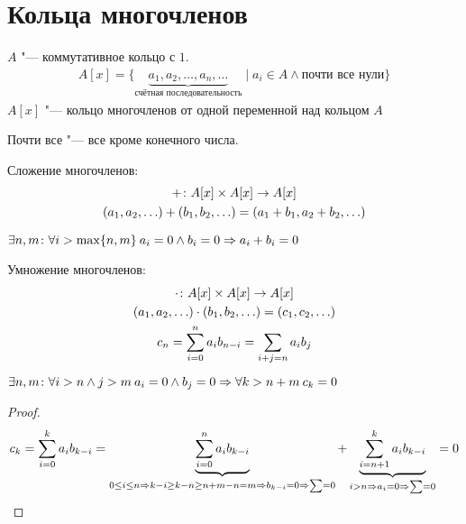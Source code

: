 \section{Кольца многочленов}

\begin{Def}
$A$ "--- коммутативное кольцо с $1$.
\begin{gather*}
A[x] = \{ \underbrace{a_1, a_2, \ldots, a_n, \ldots}_{\text{счётная последовательность}} \mid a_i \in A \land\text{почти все нули}\}
\end{gather*}
$A[x]$ "--- кольцо многочленов от одной переменной над кольцом $A$
\end{Def}
		 
\begin{Rem}
Почти все "--- все кроме конечного числа.
\end{Rem}
	 
\begin{Def}	
Сложение многочленов: 
\begin{gather*}
+\colon A[x] \times A[x] \rightarrow A[x] \\ 
(a_1, a_2, \ldots) + (b_1, b_2, \ldots) = (a_1 + b_1, a_2 + b_2, \ldots)
\end{gather*}
\end{Def}
	
\begin{Rem}
$\exists n, m\colon \forall i > \max\{n, m\}\: a_i = 0 \land b_i = 0 \Rightarrow a_i + b_i = 0$
\end{Rem}
	 
\begin{Def}	
Умножение многочленов:
\begin{gather*}
\cdot\colon A[x] \times A[x] \rightarrow A[x] \\
(a_1, a_2, \ldots) \cdot (b_1, b_2, \ldots) = (c_1, c_2, \ldots) \\
c_n = \sum_{i=0}^n a_ib_{n - i} = \sum_{i + j = n} a_ib_j
\end{gather*}
\end{Def}
		 
\begin{Rem}
$\exists n, m\colon \forall i>n \land j>m\: a_i = 0 \land b_j = 0 \Rightarrow \forall k > n + m\: c_k = 0 $
\end{Rem}
	
\begin{proof}
\begin{gather*}
c_k = \sum_{i=0}^k a_ib_{k - i} = \underbrace{\sum_{i=0}^n a_ib_{k - i}}_{0\leq i\leq n \Rightarrow k-i \geq k-n \geq n+m-n = m \Rightarrow b_{k - i} = 0 \Rightarrow \sum = 0} +
\underbrace{\sum_{i=n+1}^k a_ib_{k-i}}_{i>n \Rightarrow a_i = 0 \Rightarrow \sum = 0} = 0
\end{gather*}
\end{proof}	
	
